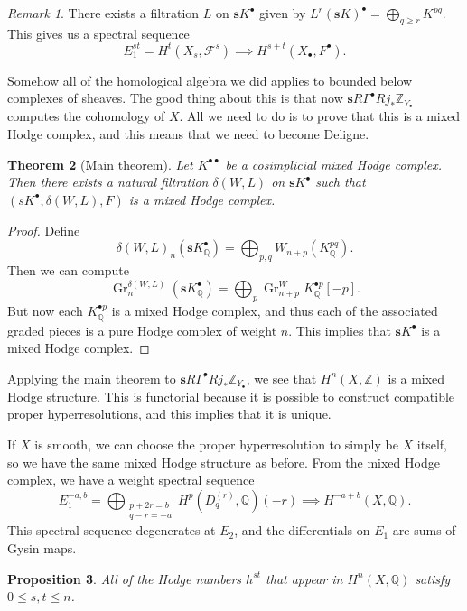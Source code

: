 \documentclass[leqno, openany]{memoir}
\newtheorem{thm}{Theorem}[section]
\newtheorem{prop}[thm]{Proposition}
\theoremstyle{definition}
\theoremstyle{remark}
\newtheorem{rmk}[thm]{Remark}
\theoremstyle{plain}
\theoremstyle{definition}
\theoremstyle{remark}
\newcommand{\Z}{\mathbb{Z}}
\newcommand{\Q}{\mathbb{Q}}
\newcommand{\mc}[1]{\mathcal{#1}}
\newcommand{\on}[1]{\operatorname{#1}}
\begin{document}
\begin{rmk}
    There exists a filtration $L$ on $\mathbf{s}K^{\bullet}$ given by $L^r(\mathbf{s}K)^{\bullet} = \bigoplus_{q \geq r} K^{pq}$. This gives us a spectral sequence
    \[ E_1^{st} = H^t(X_s, \mc{F}^s) \implies H^{s+t}(X_{\bullet}, F^{\bullet}). \]
\end{rmk}

Somehow all of the homological algebra we did applies to bounded below complexes of sheaves. The good thing about this is that now $\mathbf{s} R \Gamma^{\bullet} R j_* \Z_{Y_{\bullet}}$ computes the cohomology of $X$. All we need to do is to prove that this is a mixed Hodge complex, and this means that we need to become Deligne.

\begin{thm}[Main theorem]
    Let $K^{\bullet \bullet}$ be a cosimplicial mixed Hodge complex. Then there exists a natural filtration $\delta(W, L)$ on $\mathbf{s} K^{\bullet}$ such that $(s K^{\bullet}, \delta(W, L), F)$ is a mixed Hodge complex.
\end{thm}

\begin{proof}
    Define
    \[ \delta(W, L)_n (\mathbf{s}K^{\bullet}_{\Q}) = \bigoplus_{p,q} W_{n+p}(K_{\Q}^{pq}). \]
    Then we can compute
    \[ \on{Gr}_n^{\delta(W,L)} (\mathbf{s}K^{\bullet}_{\Q}) = \bigoplus_p \on{Gr}_{n+p}^W K_{\Q}^{\bullet p} [-p]. \]
    But now each $K_{\Q}^{\bullet p}$ is a mixed Hodge complex, and thus each of the associated graded pieces is a pure Hodge complex of weight $n$. This implies that $\mathbf{s}K^{\bullet}$ is a mixed Hodge complex.
\end{proof}

Applying the main theorem to $\mathbf{s} R \Gamma^{\bullet} R j_* \Z_{Y_{\bullet}}$, we see that $H^n(X, \Z)$ is a mixed Hodge structure. This is functorial because it is possible to construct compatible proper hyperresolutions, and this implies that it is unique.

If $X$ is smooth, we can choose the proper hyperresolution to simply be $X$ itself, so we have the same mixed Hodge structure as before. From the mixed Hodge complex, we have a weight spectral sequence
\[ E_1^{-a,b} = \bigoplus_{\substack{p+2r = b \\ q-r = -a}} H^p(D_q^{(r)}, \Q)(-r) \implies H^{-a+b}(X, \Q). \]
This spectral sequence degenerates at $E_2$, and the differentials on $E_1$ are sums of Gysin maps.

\begin{prop}
    All of the Hodge numbers $h^{st}$ that appear in $H^n(X, \Q)$ satisfy $0 \leq s,t \leq n$.
\end{prop}
\end{document}
